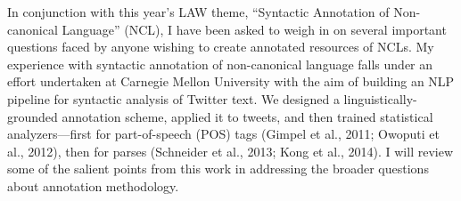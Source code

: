 In conjunction with this year's LAW theme, ``Syntactic Annotation of Non-canonical Language'' (NCL), I have been asked to weigh in on several important questions faced by anyone wishing to create annotated resources of NCLs. My experience with syntactic annotation of non-canonical language falls under an effort undertaken at Carnegie Mellon University with the aim of building an NLP pipeline for syntactic analysis of Twitter text. We designed a linguistically-grounded annotation scheme, applied it to tweets, and then trained statistical analyzers—first for part-of-speech (POS) tags (Gimpel et al., 2011; Owoputi et al., 2012), then for parses (Schneider et al., 2013; Kong et al., 2014). I will review some of the salient points from this work in addressing the broader questions about annotation methodology.
